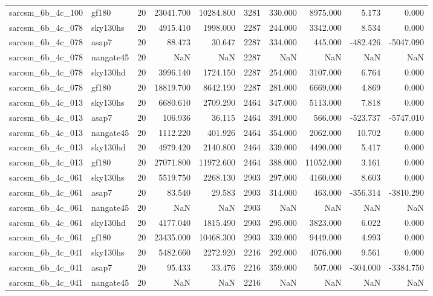 \begin{longtable}{llrrrrrrrr}
sarcsm\_6b\_4c\_100 & gf180 & 20 & 23041.700 & 10284.800 & 3281 & 330.000 & 8975.000 & 5.173 & 0.000 \\
sarcsm\_6b\_4c\_078 & sky130hs & 20 & 4915.410 & 1998.000 & 2287 & 244.000 & 3342.000 & 8.534 & 0.000 \\
sarcsm\_6b\_4c\_078 & asap7 & 20 & 88.473 & 30.647 & 2287 & 334.000 & 445.000 & -482.426 & -5047.090 \\
sarcsm\_6b\_4c\_078 & nangate45 & 20 & NaN & NaN & 2287 & NaN & NaN & NaN & NaN \\
sarcsm\_6b\_4c\_078 & sky130hd & 20 & 3996.140 & 1724.150 & 2287 & 254.000 & 3107.000 & 6.764 & 0.000 \\
sarcsm\_6b\_4c\_078 & gf180 & 20 & 18819.700 & 8642.190 & 2287 & 281.000 & 6669.000 & 4.869 & 0.000 \\
sarcsm\_6b\_4c\_013 & sky130hs & 20 & 6680.610 & 2709.290 & 2464 & 347.000 & 5113.000 & 7.818 & 0.000 \\
sarcsm\_6b\_4c\_013 & asap7 & 20 & 106.936 & 36.115 & 2464 & 391.000 & 566.000 & -523.737 & -5747.010 \\
sarcsm\_6b\_4c\_013 & nangate45 & 20 & 1112.220 & 401.926 & 2464 & 354.000 & 2062.000 & 10.702 & 0.000 \\
sarcsm\_6b\_4c\_013 & sky130hd & 20 & 4979.420 & 2140.800 & 2464 & 339.000 & 4490.000 & 5.417 & 0.000 \\
sarcsm\_6b\_4c\_013 & gf180 & 20 & 27071.800 & 11972.600 & 2464 & 388.000 & 11052.000 & 3.161 & 0.000 \\
sarcsm\_6b\_4c\_061 & sky130hs & 20 & 5519.750 & 2268.130 & 2903 & 297.000 & 4160.000 & 8.603 & 0.000 \\
sarcsm\_6b\_4c\_061 & asap7 & 20 & 83.540 & 29.583 & 2903 & 314.000 & 463.000 & -356.314 & -3810.290 \\
sarcsm\_6b\_4c\_061 & nangate45 & 20 & NaN & NaN & 2903 & NaN & NaN & NaN & NaN \\
sarcsm\_6b\_4c\_061 & sky130hd & 20 & 4177.040 & 1815.490 & 2903 & 295.000 & 3823.000 & 6.022 & 0.000 \\
sarcsm\_6b\_4c\_061 & gf180 & 20 & 23435.000 & 10468.300 & 2903 & 339.000 & 9449.000 & 4.993 & 0.000 \\
sarcsm\_6b\_4c\_041 & sky130hs & 20 & 5482.660 & 2272.920 & 2216 & 292.000 & 4076.000 & 9.561 & 0.000 \\
sarcsm\_6b\_4c\_041 & asap7 & 20 & 95.433 & 33.476 & 2216 & 359.000 & 507.000 & -304.000 & -3384.750 \\
sarcsm\_6b\_4c\_041 & nangate45 & 20 & NaN & NaN & 2216 & NaN & NaN & NaN & NaN \\

\end{longtable}
